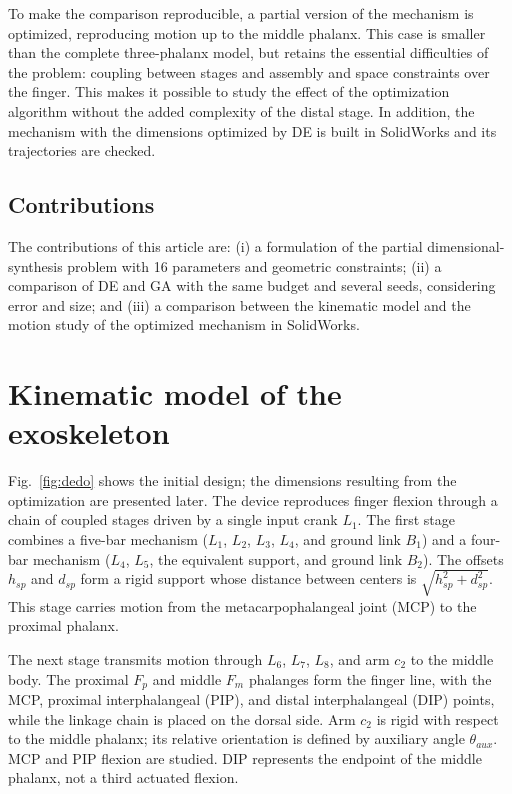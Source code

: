 \documentclass[conference,letterpaper]{IEEEtran}
\begin{document}
To make the comparison reproducible, a partial version of the mechanism is optimized, reproducing motion up to the middle phalanx. This case is smaller than the complete three-phalanx model, but retains the essential difficulties of the problem: coupling between stages and assembly and space constraints over the finger. This makes it possible to study the effect of the optimization algorithm without the added complexity of the distal stage. In addition, the mechanism with the dimensions optimized by DE is built in SolidWorks and its trajectories are checked.

\subsection{Contributions}
The contributions of this article are: (i) a formulation of the partial dimensional-synthesis problem with 16 parameters and geometric constraints; (ii) a comparison of DE and GA with the same budget and several seeds, considering error and size; and (iii) a comparison between the kinematic model and the motion study of the optimized mechanism in SolidWorks.

\section{Kinematic model of the exoskeleton}
Fig.~\ref{fig:dedo} shows the initial design; the dimensions resulting from the optimization are presented later. The device reproduces finger flexion through a chain of coupled stages driven by a single input crank $L_1$. The first stage combines a five-bar mechanism ($L_1$, $L_2$, $L_3$, $L_4$, and ground link $B_1$) and a four-bar mechanism ($L_4$, $L_5$, the equivalent support, and ground link $B_2$). The offsets $h_{sp}$ and $d_{sp}$ form a rigid support whose distance between centers is $\sqrt{h_{sp}^2+d_{sp}^2}$. This stage carries motion from the metacarpophalangeal joint (MCP) to the proximal phalanx.

The next stage transmits motion through $L_6$, $L_7$, $L_8$, and arm $c_2$ to the middle body. The proximal $F_p$ and middle $F_m$ phalanges form the finger line, with the MCP, proximal interphalangeal (PIP), and distal interphalangeal (DIP) points, while the linkage chain is placed on the dorsal side. Arm $c_2$ is rigid with respect to the middle phalanx; its relative orientation is defined by auxiliary angle $\theta_{aux}$. MCP and PIP flexion are studied. DIP represents the endpoint of the middle phalanx, not a third actuated flexion.
\end{document}
